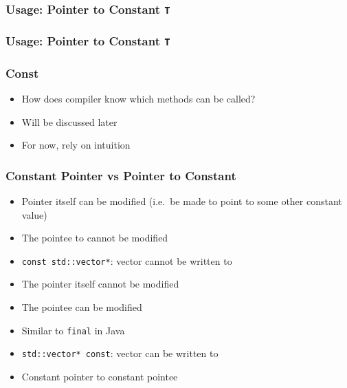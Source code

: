 \begin{frame}
  \frametitle{Usage: Pointer to Constant {\tt T}}
\end{frame}

\begin{frame}
  \frametitle{Usage: Pointer to Constant {\tt T}}
\end{frame}

\begin{frame}
  \frametitle{Const}
  \begin{itemize}
    \item How does compiler know which methods can be called?
    \item Will be discussed later
    \item For now, rely on intuition
  \end{itemize}
\end{frame}

\begin{frame}
  \frametitle{Constant Pointer vs Pointer to Constant}
  \begin{itemize}
    \item Pointer itself can be modified (i.e.\ be made to point to some other constant value)
    \item The pointee to cannot be modified
    \item {\tt const std::vector*}: vector cannot be written to
  \end{itemize}
  \vskip2mm
  \begin{itemize}
    \item The pointer itself cannot be modified
    \item The pointee can be modified
    \item Similar to {\tt final} in Java
    \item {\tt std::vector* const}: vector can be written to
  \end{itemize}
  \vskip2mm
  \begin{itemize}
    \item Constant pointer to constant pointee
  \end{itemize}
\end{frame}





